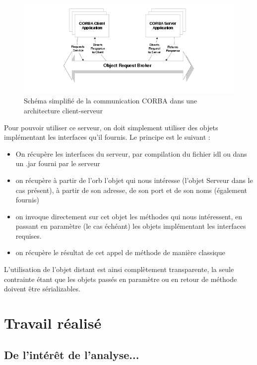 \documentclass[a4paper, french, 11pt]{report}
\begin{document}
\begin{figure}[!ht]
\begin{center}
\includegraphics[width=12cm]{corba.png}
\caption{Schéma simplifié de la communication CORBA dans une architecture client-serveur}
\label{ddcanalyse}
\end{center}
\end{figure}

Pour pouvoir utiliser ce serveur, on doit simplement utiliser des objets implémentant les interfaces qu'il fournis. Le principe est le suivant :

\begin{itemize}
\item On récupère les interfaces du serveur, par compilation du fichier idl ou dans un .jar fourni par le serveur 
\item on récupère à partir de l'orb l'objet qui nous intéresse (l'objet Serveur dans le cas présent), à partir de son adresse, de son port et de son noms (également fournis)
\item on invoque directement sur cet objet les méthodes qui nous intéressent, en passant en paramètre (le cas échéant) les objets implémentant les interfaces requises.
\item on récupère le résultat de cet appel de méthode de manière classique
\end{itemize}

L'utilisation de l'objet distant est ainsi complètement transparente, la seule contrainte étant que les objets passés en paramètre ou en retour de méthode doivent être sérializables.

\chapter{Travail réalisé}

\minitoc

\section{De l'intérêt de l'analyse...}
\end{document}
